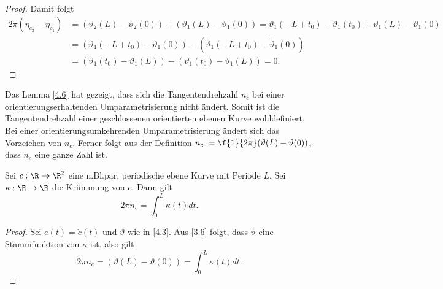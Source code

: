 \documentclass{mycourse}
\newcommand{\tta}{\vartheta}
\begin{document}
\begin{lem}
\begin{proof}
Damit folgt
\begin{align*}
 2 \pi (\eta_{c_2} - \eta_{c_1})  &= (\tta_2(L) - \tta_2(0)) + (\tta_1(L) - \tta_1(0)) = \tta_1(-L + t_0) - \tta_1(t_0) + \tta_1(L) - \tta_1(0)  \\
& =  (\tta_1(-L+t_0) - \tta_1(0)) - (\tilde \tta_1(-L+t_0) - \tilde \tta_1(0)) \\ 
&= (\tta_1(t_0) -\tta_1(L)) - (\tta_1(t_0) - \tta_1(L))  = 0.
\end{align*}
\end{proof}
\end{lem}

Das Lemma \ref{4.6} hat gezeigt, dass sich die Tangentendrehzahl $n_c$ bei einer orientierungserhaltenden Umparametrisierung nicht ändert. Somit ist die Tangentendrehzahl einer geschlossenen orientierten ebenen Kurve wohldefiniert. Bei einer orientierungsumkehrenden Umparametrisierung ändert sich das Vorzeichen von $n_c$. Ferner folgt aus der Definition $n_c := \f{1}{2 \pi} (\tta(L) - \tta(0))$, dass $n_c$ eine ganze Zahl ist.

\begin{st}
\label{4.7}
Sei $c: \R \to \R^2$ eine n.Bl.par. periodische ebene Kurve mit Periode $L$. Sei $\kappa : \R \to \R$ die Krümmung von $c$. Dann gilt
\[ 2 \pi n_c = \int_0^L \kappa(t) dt .\]
\begin{proof}
Sei $e(t) = \dot c(t)$ und $\tta$ wie in \ref{4.3}. Aus \ref{3.6} folgt, dass $\tta$ eine Stammfunktion von $\kappa$ ist, also gilt \[ 2 \pi n_c = (\tta(L) - \tta(0)) = \int_0^L \kappa(t) dt . \]
\end{proof}
\end{st}
\end{document}
